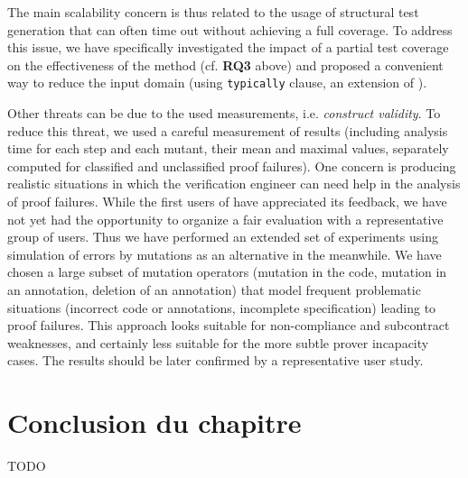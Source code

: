 The main scalability concern is thus related to the usage of structural test generation 
that can often time out without achieving a full coverage.
To address this issue, we have specifically investigated the impact of a partial test coverage
on the effectiveness of the method (cf. \textbf{RQ3} above) and proposed
a convenient way to reduce the input domain (using \lstinline{typically} clause, 
an extension of \acsl).

Other threats can be due to the used measurements, i.e. \textit{construct validity}.
To reduce this threat, we used a careful measurement of 
results (including analysis time for each step and 
each mutant, their mean and maximal values, 
separately computed for classified and unclassified proof failures).
One concern is producing realistic situations in which 
the verification engineer can need help in the analysis of proof failures.
While the first users of \stady have appreciated its feedback, %
we have not yet had the opportunity to organize a fair evaluation with a 
representative group of users. 
Thus we have performed an extended set of experiments using simulation of 
errors by mutations as an alternative in the meanwhile. 
We have chosen a large subset of mutation operators (mutation in the code,
mutation in an annotation, deletion of an annotation) that model 
frequent problematic situations 
(incorrect code or annotations, incomplete specification)
leading to proof failures.
This approach looks suitable for non-compliance and subcontract weaknesses, and
certainly less suitable for the more subtle prover incapacity cases.
The results should be later confirmed by a representative user study.


\section*{Conclusion du chapitre}


TODO
